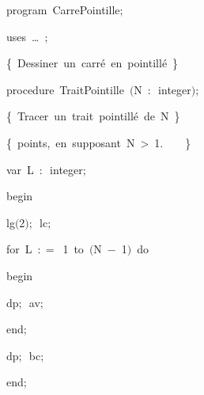 
{
\parindent {}
\medskip

\carrenoir
\vspace{\neglskip}\mbox{\blc  \idt  \mcl program\idt \label{prog:CarrePointille}\ CarrePointille$;$
}\par 
\vspace{\neglskip}\mbox{\blc \blk\idt \mcl uses\idt \ \ldots\ $;$
}\par 
\vspace{\neglskip}\mbox{\blc  \blk\idt  \cmt  \{\ Dessiner\ un\ carré\ en\ pointillé\ \}\idt }\par 
\medskip

\pagebreak[3] 
\vspace{\neglskip}\mbox{\blc  \blk\idt  \mcl procedure\idt \ TraitPointille\ $($N\ $:$\ integer$)$$;$}\par 
\vspace{\neglskip}\mbox{\blc  \blk\blk\idt  \cmt  \{\ Tracer\ un\ trait\ pointillé\ de\ N\ \}\idt }\par 
\vspace{\neglskip}\mbox{\blc  \blk\blk\idt  \cmt  \{\ points,\ en\ supposant\ N\ >\ 1.\ \ \ \ \}\idt }\par 
\pagebreak[3] 
\vspace{\neglskip}\mbox{\blc  \blk\blk\idt  \mcl var\idt \ L\ $:$\ integer$;$}\par 
\vspace{\neglskip}\mbox{\blc  \blk\idt  \mcl begin\idt }\par 
\vspace{\neglskip}\mbox{\blc  \blk\blk\idt  lg$($2$)$$;$\ lc$;$\ }\par 
\pagebreak[3] 
\vspace{\neglskip}\mbox{\blc  \blk\blk\idt  \mcl for\idt \ L\ $:$$=$\ 1\ \mcl to\idt \ $($N\ $-$\ 1$)$\ \mcl do\idt }\par 
\vspace{\neglskip}\mbox{\blc  \blk\blk\blk\idt  \mcl begin\idt }\par 
\vspace{\neglskip}\mbox{\blc  \blk\blk\blk\blk\idt  dp$;$\ av$;$}\par 
\vspace{\neglskip}\mbox{\blc  \blk\blk\blk\idt  \mcl end\idt $;$}\par 
\vspace{\neglskip}\mbox{\blc  \blk\blk\idt  dp$;$\ bc$;$}\par 
\vspace{\neglskip}\mbox{\blc  \blk\idt  \mcl end\idt $;$}\par 
\medskip

}
